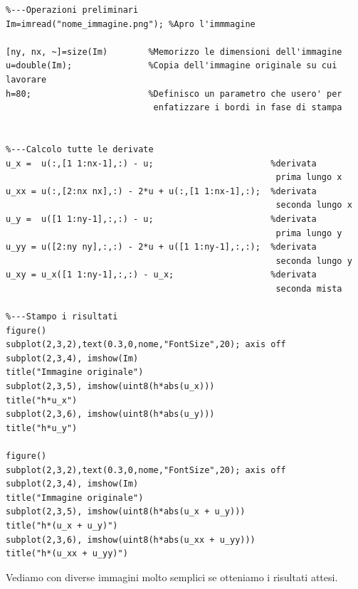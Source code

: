 \begin{lstlisting}
%---Operazioni preliminari
Im=imread("nome_immagine.png");	%Apro l'immmagine

[ny, nx, ~]=size(Im)        %Memorizzo le dimensioni dell'immagine
u=double(Im);               %Copia dell'immagine originale su cui lavorare
h=80;                       %Definisco un parametro che usero' per 
                             enfatizzare i bordi in fase di stampa 


%---Calcolo tutte le derivate
u_x =  u(:,[1 1:nx-1],:) - u;                       %derivata 
                                                     prima lungo x
u_xx = u(:,[2:nx nx],:) - 2*u + u(:,[1 1:nx-1],:);  %derivata 
                                                     seconda lungo x
u_y =  u([1 1:ny-1],:,:) - u;                       %derivata
                                                     prima lungo y
u_yy = u([2:ny ny],:,:) - 2*u + u([1 1:ny-1],:,:);  %derivata 
                                                     seconda lungo y
u_xy = u_x([1 1:ny-1],:,:) - u_x;                   %derivata 
                                                     seconda mista
   
%---Stampo i risultati
figure()
subplot(2,3,2),text(0.3,0,nome,"FontSize",20); axis off
subplot(2,3,4), imshow(Im)
title("Immagine originale")
subplot(2,3,5), imshow(uint8(h*abs(u_x)))
title("h*u_x")
subplot(2,3,6), imshow(uint8(h*abs(u_y)))
title("h*u_y")

figure()
subplot(2,3,2),text(0.3,0,nome,"FontSize",20); axis off
subplot(2,3,4), imshow(Im)
title("Immagine originale")
subplot(2,3,5), imshow(uint8(h*abs(u_x + u_y)))
title("h*(u_x + u_y)")
subplot(2,3,6), imshow(uint8(h*abs(u_xx + u_yy)))
title("h*(u_xx + u_yy)")
\end{lstlisting}

\vspace{6em}
Vediamo con diverse immagini molto semplici se otteniamo i risultati attesi.\\

